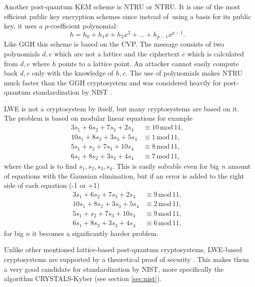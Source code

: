 Another post-quantum KEM scheme is NTRU or \acl{NTRU}. It is one of the most efficient public key encryption schemes since instead of~using a basis for its public key, it uses a $p$-coefficient polynomial:
\begin{equation}
  h=h_0+h_1x+h_2x^2+\dots+h_{p-1}x^{p-1}.
\end{equation}
Like GGH this scheme is based on the CVP. The message consists of two polynomials $d, e$ which are not a lattice and the ciphertext $c$ which is calculated from $d, e$ where $h$ points to a lattice point. An attacker cannot easily compute back $d, e$ only with the knowledge of $h, c$. The use of polynomials makes NTRU much faster than the GGH cryptosystem and was considered heavily for post-quantum standardization by NIST \cite{Bernstein149}.

LWE is not a cryptosystem by itself, but many cryptosystems are based on it. The problem is based on modular linear equations for example
\begin{align}
  3s_1+6s_2+7s_3+2s_4&\equiv 10\,\mathrm{mod}\,11,\\
  10s_1+8s_2+3s_3+5s_4&\equiv 1\,\mathrm{mod}\,11,\\
  5s_1+s_2+7s_3+10s_4&\equiv 8\,\mathrm{mod}\,11,\\
  6s_1+8s_2+3s_3+4s_4&\equiv 7\,\mathrm{mod}\,11,
\end{align}
where the goal is to find $s_1, s_2, s_3, s_4$. This is easily solvable even for big $n$ amount of equations with the Gaussian elimination, but if an error is added to the right side of each equation (-1 or +1)
\begin{align}
  3s_1+6s_2+7s_3+2s_4&\equiv 9\,\mathrm{mod}\,11,\\
  10s_1+8s_2+3s_3+5s_4&\equiv 2\,\mathrm{mod}\,11,\\
  5s_1+s_2+7s_3+10s_4&\equiv 9\,\mathrm{mod}\,11,\\
  6s_1+8s_2+3s_3+4s_4&\equiv 6\,\mathrm{mod}\,11,
\end{align}
for big $n$ it becomes a significantly harder problem. \cite{Regev2005}

Unlike other mentioned lattice-based post-quantum cryptosystems, LWE-based cryptosystems are supported by a theoretical proof of security \cite{Bernstein2009}. This makes them a very good candidate for standardization by NIST, more specifically the algorithm CRYSTALS-Kyber (see section \ref{sec:nist}).
